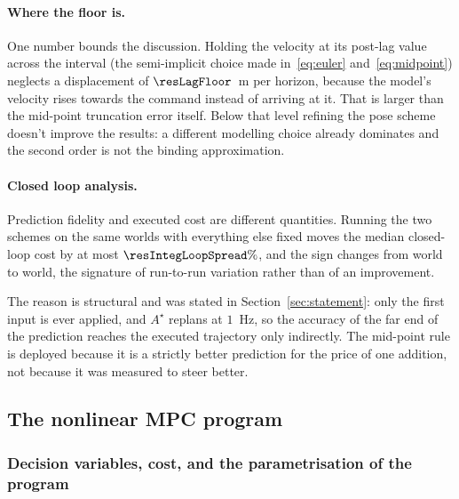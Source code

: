 \documentclass[11pt,a4paper]{article}
\newcommand{\astar}{$A^\star$}
\begin{document}
\paragraph{Where the floor is.} One number bounds the discussion. Holding the velocity at its post-lag value
across the interval (the semi-implicit choice made in~\eqref{eq:euler} and~\eqref{eq:midpoint}) neglects
a displacement of $\resLagFloor$~m per horizon, because the model's velocity rises towards the command
instead of arriving at it. That is larger than the mid-point truncation error itself. Below that level
refining the pose scheme doesn't improve the results: a different modelling choice already dominates and the second
order is not the binding approximation.

\paragraph{Closed loop analysis.} Prediction fidelity and executed cost are different quantities.
Running the two schemes on the same worlds with everything else fixed moves the median closed-loop cost by at
most $\resIntegLoopSpread\%$, and the sign changes from world to world, the signature of run-to-run
variation rather than of an improvement.

\begin{table}[htbp]
  \centering
  \small
  \caption{%
  Closed-loop cost with the two integrators, same profile otherwise. A positive $\Delta$ means the
  mid-point rule is cheaper.}
  \label{res:tab:integloop}
\end{table}

The reason is structural and was stated in Section~\ref{sec:statement}: only the first input is ever applied,
and \astar{} replans at $1$~Hz, so the accuracy of the far end of the prediction reaches the executed
trajectory only indirectly. The mid-point rule is deployed because it is a strictly better prediction for the
price of one addition, not because it was measured to steer better.

\subsection{The nonlinear MPC program}
\label{sec:nlp}

\subsubsection{Decision variables, cost, and the parametrisation of the program}
\label{sec:shoot}
\end{document}

